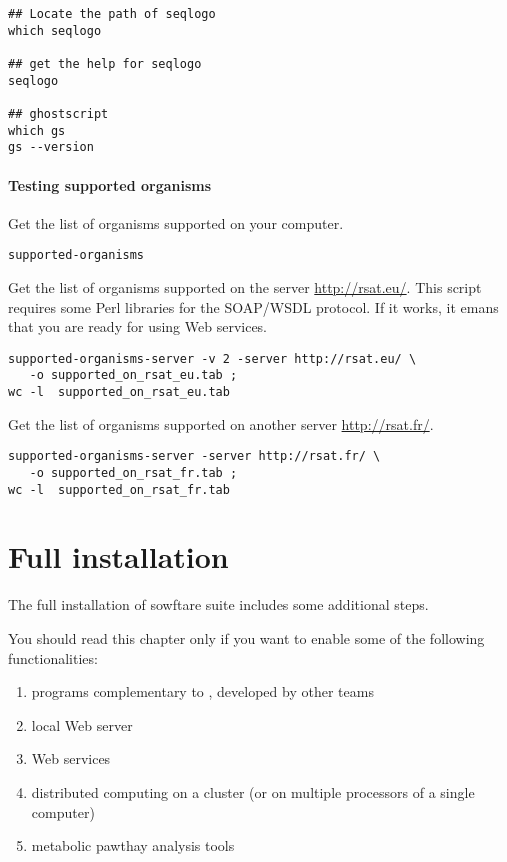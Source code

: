 \documentclass[12pt,a4paper, oneside]{scrreprt} %
\begin{document}
\begin{lstlisting}
## Locate the path of seqlogo
which seqlogo

## get the help for seqlogo
seqlogo

## ghostscript
which gs
gs --version
\end{lstlisting}


\subsubsection{Testing supported organisms}

Get the list of organisms supported on your computer.

\begin{lstlisting}
supported-organisms
\end{lstlisting}

Get the list of organisms supported on the server
\url{http://rsat.eu/}. This script requires some Perl libraries for
the SOAP/WSDL protocol. If it works, it emans that you are ready for
using \RSAT Web services.

\begin{lstlisting}
supported-organisms-server -v 2 -server http://rsat.eu/ \
   -o supported_on_rsat_eu.tab ; 
wc -l  supported_on_rsat_eu.tab
\end{lstlisting}

Get the list of organisms supported on another server
\url{http://rsat.fr/}.

\begin{lstlisting}
supported-organisms-server -server http://rsat.fr/ \
   -o supported_on_rsat_fr.tab ; 
wc -l  supported_on_rsat_fr.tab
\end{lstlisting}



\chapter{Full installation}

The full installation of \RSAT sowftare suite includes some additional steps.

You should read this chapter only if you want to enable some of the
following functionalities:
\begin{enumerate}
  \item programs complementary to \RSAT, developed by other teams
  \item local Web server
  \item Web services
  \item distributed computing on a cluster (or on multiple processors
    of a single computer)
  \item metabolic pawthay analysis tools
\end{enumerate}
\end{document}

